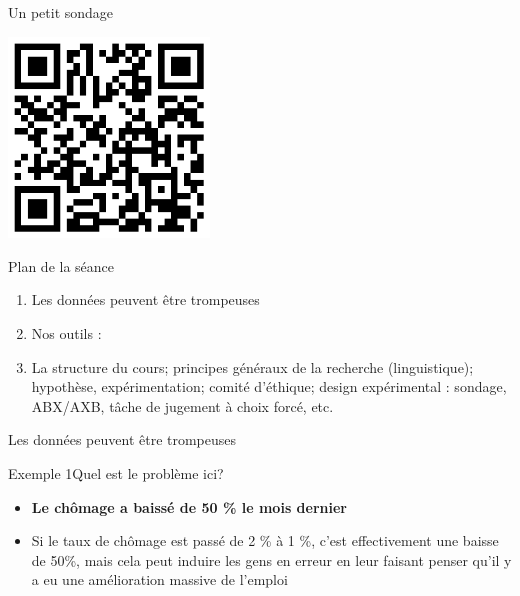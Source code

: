\documentclass[xcolor=dvipsnames, onlymath, 10pt, aspectratio=169, handout]{beamer}
\begin{document}
\begin{frame}{Un petit sondage}{}

	\begin{center}
		\includegraphics[width = 0.4\textwidth]{qr.png}
	\end{center}

\end{frame}


\begin{frame}{Plan de la séance}

	\begin{enumerate}
		\item Les données peuvent être trompeuses
		\item Nos outils : 
		\item La structure du cours; principes généraux de la recherche (linguistique); hypothèse, expérimentation; comité d’éthique; design expérimental : sondage, ABX/AXB, tâche de jugement à choix forcé, etc.
	\end{enumerate}

\end{frame}



\begin{transitionframe}


	Les données peuvent être trompeuses


\end{transitionframe}


\begin{frame}{Exemple 1}{Quel est le problème ici?}


	\begin{important}
		\begin{itemize}
			\item[] \textbf{Le chômage a baissé de 50 \% le mois dernier}
			      \pause
			\item[\winner] Si le taux de chômage est passé de 2 \% à 1 \%, c'est effectivement une baisse de 50\%, mais cela peut induire les gens en erreur en leur faisant penser qu'il y a eu une amélioration massive de l'emploi
		\end{itemize}
	\end{important}

\end{frame}
\end{document}
